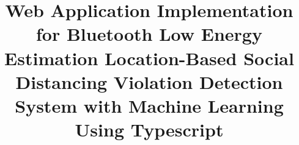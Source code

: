 \documentclass[conference]{IEEEtran}
\begin{document}
\title{Web Application Implementation for Bluetooth Low Energy Estimation Location-Based Social Distancing Violation Detection System with Machine Learning Using Typescript\\
}

\author{
}

\maketitle
\end{document}
